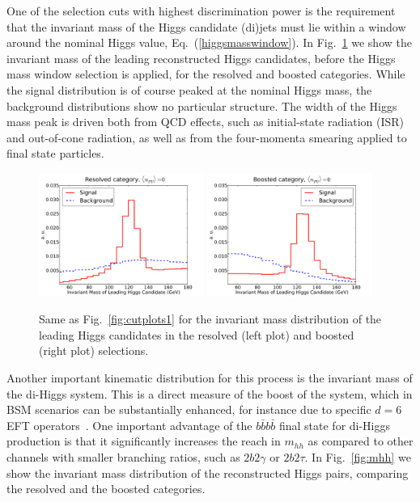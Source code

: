 One of the selection cuts with highest discrimination power is the requirement
that the invariant mass of the Higgs candidate (di)jets must lie within a window
around the nominal Higgs value, Eq.~(\ref{higgsmasswindow}).
%
In Fig.~\ref{fig:mHHinv} we show the invariant mass
of the leading reconstructed Higgs candidates, before the Higgs mass window
selection
  is applied, for the resolved and boosted categories.
%
While the signal distribution is of course peaked at the
nominal Higgs mass, the background distributions
show no particular
structure.
%
The
width of the Higgs mass peak is driven both from QCD effects,
such as initial-state radiation (ISR)
and out-of-cone radiation, as well
as from the four-momenta smearing applied to final state particles.
%

\begin{figure}[t]
\begin{center}
  \includegraphics[width=0.48\textwidth]{plots/m_H0_res_C1d_noPU.pdf}
  \includegraphics[width=0.48\textwidth]{plots/m_H0_bst_C1d_noPU.pdf}
  \caption{\small Same as   Fig.~\ref{fig:cutplots1} for the invariant
    mass distribution of the leading Higgs candidates in the resolved
    (left plot) and boosted (right plot) selections.
}
\label{fig:mHHinv}
\end{center}
\end{figure}


Another important kinematic distribution for
this process is the invariant mass
of the di-Higgs system.
%
This is a direct measure of the boost of the system,
which in  BSM scenarios can be substantially
enhanced, for instance due to
specific $d=6$ EFT operators~\cite{Azatov:2015oxa}.
%
One important advantage of the $b\bar{b}b\bar{b}$ final state for
di-Higgs production is that it significantly increases the reach
in $m_{hh}$ as compared to other channels with smaller branching
ratios,
such as $2b2\gamma$ or $2b2\tau$.
%
In Fig.~\ref{fig:mhh} we show the invariant mass distribution of the
reconstructed Higgs pairs,
comparing the resolved and the boosted categories.

